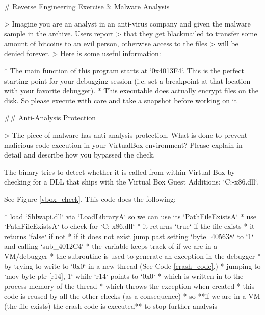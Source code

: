\clearpage
\begin{markdown}


# Reverse Engineering Exercise 3: Malware Analysis

> \noindent Imagine you are an analyst in an anti-virus company and given the malware sample in the archive. Users report
> that they get blackmailed to transfer some amount of bitcoins to an evil person, otherwise access to the files
> will be denied forever.
\s
> Here is some useful information:

* The main function of this program starts at `0x4013F4`. This is the perfect starting point for your debugging session (i.e. set a breakpoint at that location with your favorite debugger).
* This executable does actually encrypt files on the disk. So please execute with care and take a snapshot before working on it

## Anti-Analysis Protection

> \noindent The piece of malware has anti-analysis protection. What is done to prevent malicious code execution in your VirtualBox environment? Please explain in detail and describe how you bypassed the check.

\noindent The binary tries to detect whether it is called from within Virtual Box by checking for a DLL that ships with the Virtual Box Guest Additions: 
`C:\windows{}\vboxnine-x86.dll`.

\noindent\s See Figure \ref{vbox_check}. This code does the following:

* load `Shlwapi.dll` via `LoadLibraryA` so we can use its `PathFileExistsA`
* use `PathFileExistsA` to check for `C:\windows{}\vboxnine-x86.dll`
    * it returns `true` if the file exists
    * it returns `false` if not
* if it does not exist jump past setting `byte_405638` to `1` and calling `sub_4012C4`
    * the variable keeps track of if we are in a VM/debugger
    * the subroutine is used to generate an exception in the debugger
        * by trying to write to `0x0` in a new thread (See Code \ref{crash_code}.)
            * jumping to `mov byte ptr [r14], 1` while `r14` points to `0x0`
            * which is written in to the process memory of the thread
            * which throws the exception when created
        * this code is reused by all the other checks (as a consequence)
* so **if we are in a VM (the file exists) the crash code is executed** to stop further analysis

\end{markdown}
